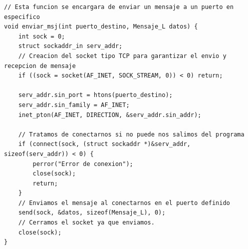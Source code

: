 \begin{lstlisting}[style=estiloC]
// Esta funcion se encargara de enviar un mensaje a un puerto en especifico
void enviar_msj(int puerto_destino, Mensaje_L datos) {
    int sock = 0;
    struct sockaddr_in serv_addr;
    // Creacion del socket tipo TCP para garantizar el envio y recepcion de mensaje
    if ((sock = socket(AF_INET, SOCK_STREAM, 0)) < 0) return;

    serv_addr.sin_port = htons(puerto_destino);
    serv_addr.sin_family = AF_INET;
    inet_pton(AF_INET, DIRECTION, &serv_addr.sin_addr);

    // Tratamos de conectarnos si no puede nos salimos del programa
    if (connect(sock, (struct sockaddr *)&serv_addr, sizeof(serv_addr)) < 0) {
        perror("Error de conexion");
        close(sock);
        return;
    }
    // Enviamos el mensaje al conectarnos en el puerto definido
    send(sock, &datos, sizeof(Mensaje_L), 0);
    // Cerramos el socket ya que enviamos.
    close(sock);
}
\end{lstlisting}